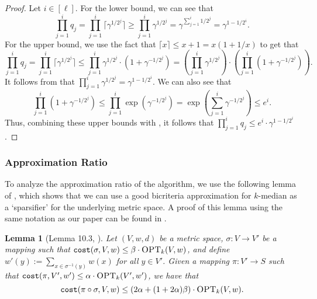 \documentclass[11pt]{article}
\newcommand{\1}{\mathmybb{1}}
\newtheorem{lemma}[theorem]{Lemma}
\newcommand{\OPT}{\textsc{OPT}}
\newcommand{\cost}{\textnormal{\texttt{cost}}}
\begin{document}
\begin{proof}
    Let $i \in [\ell]$. For the lower bound, we can see that
    \begin{equation}\label{eq:prod q 1}
        \prod_{j=1}^i q_j = \prod_{j=1}^i \lceil \gamma^{1/2^j} \rceil \geq \prod_{j=1}^i \gamma^{1/2^j} = \gamma^{\sum_{j=1}^i 1/2^j} = \gamma^{1 - 1/2^i}.
    \end{equation}    
    For the upper bound, we use the fact that $\lceil x \rceil \leq x + 1 = x (1 + 1/x)$ to get that
    \begin{equation}\label{eq:prod q 2}
        \prod_{j=1}^i q_j = \prod_{j=1}^i \lceil \gamma^{1/2^j} \rceil \leq \prod_{j=1}^i \gamma^{1/2^j} \cdot \left(1 + \gamma^{-1/2^j}\right) = \left(\prod_{j=1}^i \gamma^{1/2^j} \right) \cdot \left(\prod_{j=1}^i \left(1 + \gamma^{-1/2^j}\right) \right).
    \end{equation}
    It follows from  that $\prod_{j=1}^i \gamma^{1/2^j} = \gamma^{1 - 1/2^i}$. We can also see that
    $$ \prod_{j=1}^i \left(1 + \gamma^{-1/2^j}\right) \leq \prod_{j=1}^i \exp \! \left(\gamma^{-1/2^j}\right) = \exp \! \left(\sum_{j=1}^i \gamma^{-1/2^j}\right) \leq e^i.$$
    Thus, combining these upper bounds with , it follows that $\prod_{j=1}^i q_j \leq e^i \cdot \gamma^{1 - 1/2^i}$.
\end{proof}

\subsubsection*{Approximation Ratio}
To analyze the approximation ratio of the algorithm, we use the following lemma of \cite{focs/GuhaMMO00}, which shows that we can use a good bicriteria approximation for $k$-median as a `sparsifier' for the underlying metric space. A proof of this lemma using the same notation as our paper can be found in \cite{focs/BCLP24}.



\begin{lemma}[Lemma 10.3, \cite{focs/BCLP24}]\label{lem:bicri=sparsifier}
    Let $(V,w,d)$ be a metric space,
    $\sigma : V \longrightarrow V'$ be a mapping such that $\cost(\sigma, V, w) \leq \beta \cdot \OPT_k(V, w)$, and define $w'(y) := \sum_{x \in \sigma^{-1}(y)} w(x)$ for all $y \in V'$. Given a mapping $\pi : V' \longrightarrow S$ such that $\cost(\pi, V', w') \leq \alpha \cdot \OPT_k(V', w')$, we have that
    $$ \cost(\pi \circ \sigma, V, w) \leq (2\alpha + (1 + 2\alpha)\beta) \cdot \OPT_k(V, w). $$
\end{lemma}
\end{document}
